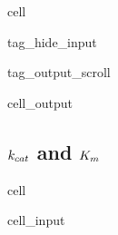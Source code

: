 \documentclass[letterpaper,10pt,english]{jupyterBook}
\begin{document}
\begin{sphinxuseclass}{cell}
\begin{sphinxuseclass}{tag_hide_input}
\begin{sphinxuseclass}{tag_output_scroll}
\begin{sphinxVerbatimOutput}
\begin{sphinxuseclass}{cell_output}
\noindent{}

\end{sphinxuseclass}\end{sphinxVerbatimOutput}

\end{sphinxuseclass}
\end{sphinxuseclass}
\end{sphinxuseclass}

\subsection{\protect\(k_{cat}\protect\) and \protect\(K_{m}\protect\)}
\label{\detokenize{scenarios/glycosidase_inhibition:k-cat-and-k-m}}
\begin{sphinxuseclass}{cell}\begin{sphinxVerbatimInput}

\begin{sphinxuseclass}{cell_input}
\begin{sphinxVerbatim}[commandchars=\\\{\}]
  \PYG{p}{[}\PYG{p}{]}
  \PYG{p}{[}\PYG{p}{]}
  \PYG{p}{[}\PYG{p}{]}
  \PYG{p}{[}\PYG{p}{]}
  \PYG{p}{[}\PYG{p}{]}
   
      

    \PYG{p}{[}\PYG{p}{]}
    \PYG{p}{[}\PYG{p}{]}

    \PYG{p}{[}\PYG{p}{]}
    \PYG{p}{[}\PYG{p}{]}



\end{sphinxVerbatim}
\end{sphinxuseclass}
\end{sphinxVerbatimInput}
\end{sphinxuseclass}
\end{document}
